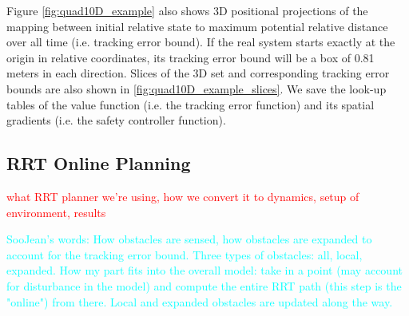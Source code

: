 Figure \ref{fig:quad10D_example} also shows 3D positional projections of the mapping between initial relative state to maximum potential relative distance over all time (i.e. tracking error bound). If the real system starts exactly at the origin in relative coordinates, its tracking error bound will be a box of 0.81 meters in each direction. Slices of the 3D set and corresponding tracking error bounds are also shown in \ref{fig:quad10D_example_slices}. We save the look-up tables of the value function (i.e. the tracking error function) and its spatial gradients (i.e. the safety controller function).

\subsection{RRT Online Planning}
\textcolor{red}{what RRT planner we're using, how we convert it to dynamics, setup of environment, results}

\textcolor{cyan}{SooJean's words: How obstacles are sensed, how obstacles are expanded to account for the tracking error bound. Three types of obstacles: all, local, expanded. How my part fits into the overall model: take in a point (may account for disturbance in the model) and compute the entire RRT path (this step is the "online") from there. Local and expanded obstacles are updated along the way.}

